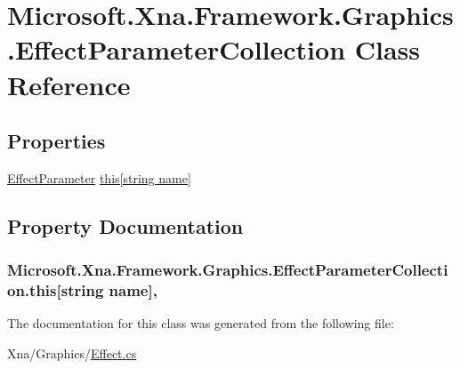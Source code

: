 \hypertarget{class_microsoft_1_1_xna_1_1_framework_1_1_graphics_1_1_effect_parameter_collection}{}\section{Microsoft.\+Xna.\+Framework.\+Graphics.\+Effect\+Parameter\+Collection Class Reference}
\label{class_microsoft_1_1_xna_1_1_framework_1_1_graphics_1_1_effect_parameter_collection}
\subsection*{Properties}
\begin{DoxyCompactItemize}
\item 
\hyperlink{class_microsoft_1_1_xna_1_1_framework_1_1_graphics_1_1_effect_parameter}{Effect\+Parameter} \hyperlink{class_microsoft_1_1_xna_1_1_framework_1_1_graphics_1_1_effect_parameter_collection_a08e6d5e6d0c3fc5f0e56e7ec33ac09f1}{this\mbox{[}string name\mbox{]}}
\end{DoxyCompactItemize}


\subsection{Property Documentation}
\hypertarget{class_microsoft_1_1_xna_1_1_framework_1_1_graphics_1_1_effect_parameter_collection_a08e6d5e6d0c3fc5f0e56e7ec33ac09f1}{}
\subsubsection[{this[string name]}]{ Microsoft.\+Xna.\+Framework.\+Graphics.\+Effect\+Parameter\+Collection.\+this\mbox{[}string name\mbox{]}\hspace{0.3cm}{\ttfamily [get]}, {\ttfamily [set]}}\label{class_microsoft_1_1_xna_1_1_framework_1_1_graphics_1_1_effect_parameter_collection_a08e6d5e6d0c3fc5f0e56e7ec33ac09f1}


The documentation for this class was generated from the following file\+:\begin{DoxyCompactItemize}
\item 
Xna/\+Graphics/\hyperlink{_effect_8cs}{Effect.\+cs}\end{DoxyCompactItemize}
